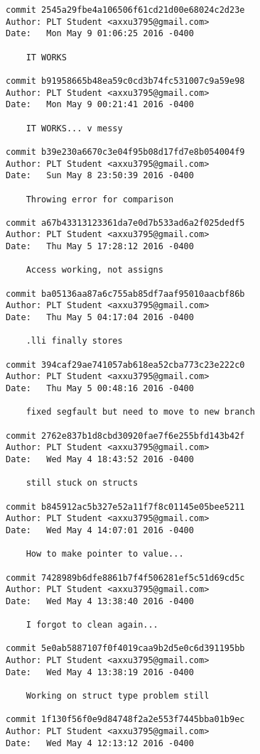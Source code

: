     \begin{lstlisting}[backgroundcolor=\color{white}]
commit 2545a29fbe4a106506f61cd21d00e68024c2d23e
Author: PLT Student <axxu3795@gmail.com>
Date:   Mon May 9 01:06:25 2016 -0400

    IT WORKS

commit b91958665b48ea59c0cd3b74fc531007c9a59e98
Author: PLT Student <axxu3795@gmail.com>
Date:   Mon May 9 00:21:41 2016 -0400

    IT WORKS... v messy

commit b39e230a6670c3e04f95b08d17fd7e8b054004f9
Author: PLT Student <axxu3795@gmail.com>
Date:   Sun May 8 23:50:39 2016 -0400

    Throwing error for comparison

commit a67b43313123361da7e0d7b533ad6a2f025dedf5
Author: PLT Student <axxu3795@gmail.com>
Date:   Thu May 5 17:28:12 2016 -0400

    Access working, not assigns

commit ba05136aa87a6c755ab85df7aaf95010aacbf86b
Author: PLT Student <axxu3795@gmail.com>
Date:   Thu May 5 04:17:04 2016 -0400

    .lli finally stores

commit 394caf29ae741057ab618ea52cba773c23e222c0
Author: PLT Student <axxu3795@gmail.com>
Date:   Thu May 5 00:48:16 2016 -0400

    fixed segfault but need to move to new branch

commit 2762e837b1d8cbd30920fae7f6e255bfd143b42f
Author: PLT Student <axxu3795@gmail.com>
Date:   Wed May 4 18:43:52 2016 -0400

    still stuck on structs

commit b845912ac5b327e52a11f7f8c01145e05bee5211
Author: PLT Student <axxu3795@gmail.com>
Date:   Wed May 4 14:07:01 2016 -0400

    How to make pointer to value...

commit 7428989b6dfe8861b7f4f506281ef5c51d69cd5c
Author: PLT Student <axxu3795@gmail.com>
Date:   Wed May 4 13:38:40 2016 -0400

    I forgot to clean again...

commit 5e0ab5887107f0f4019caa9b2d5e0c6d391195bb
Author: PLT Student <axxu3795@gmail.com>
Date:   Wed May 4 13:38:19 2016 -0400

    Working on struct type problem still

commit 1f130f56f0e9d84748f2a2e553f7445bba01b9ec
Author: PLT Student <axxu3795@gmail.com>
Date:   Wed May 4 12:13:12 2016 -0400


\end{lstlisting}
